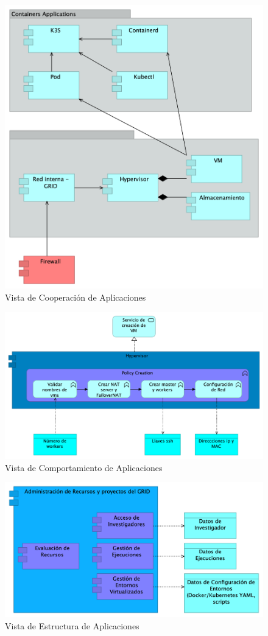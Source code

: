 \begin{figure}[H]
    \centering
    \includegraphics[width=\textwidth]{tablas-images/cp6/Application-Cooperation-View.png}
    \caption{Vista de Cooperación de Aplicaciones}
\end{figure}
\begin{figure}[H]
    \centering
    \includegraphics[width=\textwidth]{tablas-images/cp6/Application-Behaviour-view.png}
    \caption{Vista de Comportamiento de Aplicaciones}
\end{figure}
\begin{figure}[H]
    \centering
    \includegraphics[width=\textwidth]{tablas-images/cp6/Application-Structure-View.png}
    \caption{Vista de Estructura de Aplicaciones}
\end{figure}
